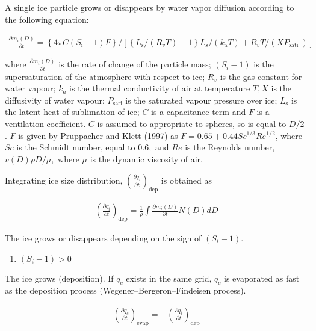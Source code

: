 A single ice particle grows or disappears by water vapor diffusion
according to the following equation:

\begin{eqnarray}
\frac{\partial m_i(D)}{\partial t}=\left\{4 \pi C\left(S_{\mathrm{i}}-1\right) F\right\} /\left[\left\{L_{\mathrm{s}} /(R_{v} T)-1\right\} L_{\mathrm{s}} /\left(k_{\mathrm{a}} T\right)+R_v T /\left(X P_{\text {sati }}\right)\right]
\end{eqnarray}

where \(\frac{\partial m_i(D)}{\partial t}\) is the rate of change of
the particle mass; \((S_i - 1)\) is the supersaturation of the
atmosphere with respect to ice; \(R_v\) is the gas constant for water
vapour; \(k_a\) is the thermal conductivity of air at temperature
\(T, X\) is the diffusivity of water vapour; \(P_{\text {sati}}\) is the
saturated vapour pressure over ice; \(L_{\mathrm{s}}\) is the latent
heat of sublimation of ice; \(C\) is a capacitance term and \(F\) is a
ventilation coefficient. \(C\) is assumed to appropriate to spheres, so
is equal to \(D/2\) . \(F\) is given by Pruppacher and Klett (1997) as
\(F=0.65+0.44 S c^{1 / 3} R e^{1 / 2}\), where \(S c\) is the Schmidt
number, equal to \(0.6,\) and \(R e\) is the Reynolds number,
\(v(D) \rho D / \mu,\) where \(\mu\) is the dynamic viscosity of air.

Integrating ice size distribution,
\(\left(\frac{\partial q_i}{\partial t}\right)_{\text {dep}}\) is
obtained as

\begin{eqnarray}
\left(\frac{\partial q_i}{\partial t}\right)_{\text {dep}}
= \frac{1}{\rho}\int \frac{\partial m_i(D)}{\partial t}N(D)dD
\end{eqnarray}

The ice grows or disappears depending on the sign of \((S_i - 1)\).

\begin{enumerate}
\def\labelenumi{\arabic{enumi}.}
\tightlist
\item
  \((S_i - 1)>0\)
\end{enumerate}

The ice grows (deposition). If \(q_c\) exists in the same grid, \(q_c\)
is evaporated as fast as the deposition process
(Wegener--Bergeron--Findeisen process).

\begin{eqnarray}
\left(\frac{\partial q_c}{\partial t}\right)_{\text {evap}}
=-\left(\frac{\partial q_i}{\partial t}\right)_{\text {dep}}
\end{eqnarray}

